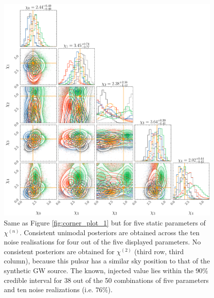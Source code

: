 \documentclass[fleqn,usenatbib,useAMS]{mnras}
\begin{document}
	\begin{figure}
	\includegraphics[width=\columnwidth, height =\columnwidth ]{images/corner_lowSNR_chi_n4000}
	\caption{Same as Figure \ref{fig:corner_plot_1}	but for five static parameters of $\chi^{(n)}$. Consistent unimodal posteriors are obtained across the ten noise realisations for four out of the five displayed parameters. No consistent posteriors are obtained for $\chi^{(2)}$ (third row, third column), because this pulsar has a similar sky position to that of the synthetic GW source. The known, injected value lies within the 90\% credible interval for 38 out of the 50 combinations of five parameters and ten noise realizations (i.e. $76 \%$). }
	\label{fig:corner_plot_3}
\end{figure}
\end{document}
